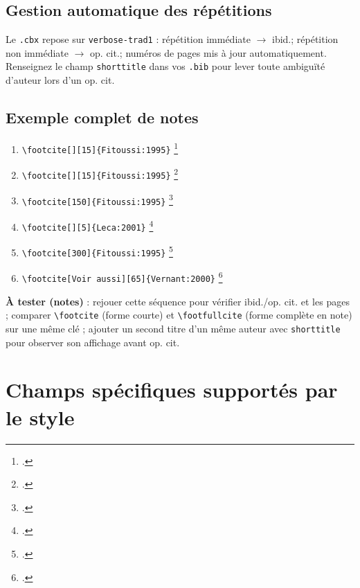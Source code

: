 \documentclass{article}
\begin{document}
\subsection{Gestion automatique des répétitions}
Le \texttt{.cbx} repose sur \texttt{verbose-trad1} : répétition immédiate $\rightarrow$ ibid.; répétition non immédiate $\rightarrow$ op. cit.; numéros de pages mis à jour automatiquement. Renseignez le champ \texttt{shorttitle} dans vos \texttt{.bib} pour lever toute ambiguïté d'auteur lors d'un op. cit.

\subsection{Exemple complet de notes}
\begin{enumerate}
	\item \texttt{\textbackslash footcite[][15]\{Fitoussi:1995\}} \footcite[15]{Fitoussi:1995}
	\item \texttt{\textbackslash footcite[][15]\{Fitoussi:1995\}} \footcite[15]{Fitoussi:1995}
	\item \texttt{\textbackslash footcite[150]\{Fitoussi:1995\}} \footcite[150]{Fitoussi:1995}
	\item \texttt{\textbackslash footcite[][5]\{Leca:2001\}} \footcite[5]{Leca:2001}
	\item \texttt{\textbackslash footcite[300]\{Fitoussi:1995\}} \footcite[300]{Fitoussi:1995}
	\item \texttt{\textbackslash footcite[Voir aussi][65]\{Vernant:2000\}} \footcite[Voir aussi][65]{Vernant:2000}
\end{enumerate}
\textbf{À tester (notes)} : rejouer cette séquence pour vérifier ibid./op. cit. et les pages ; comparer \verb|\footcite| (forme courte) et \verb|\footfullcite| (forme complète en note) sur une même clé ; ajouter un second titre d'un même auteur avec \texttt{shorttitle} pour observer son affichage avant op. cit.

\section{Champs spécifiques supportés par le style}
\end{document}
